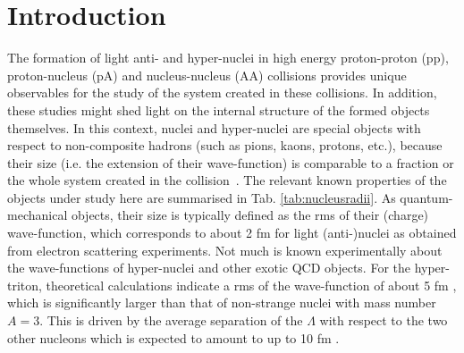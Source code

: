 \section{Introduction} 
The formation of light anti- and hyper-nuclei in high energy proton-proton (pp), proton-nucleus (pA) and nucleus-nucleus (AA) collisions provides unique observables for the study of the system created in these collisions. In addition, these studies might shed light on the internal structure of the formed objects themselves. 
In this context, nuclei and hyper-nuclei are special objects with respect to non-composite hadrons (such as pions, kaons, protons, etc.), because their size (i.e. the extension of their wave-function) is comparable to a fraction or the whole system created in the collision~\cite{Adam:2015vna}.  
The relevant known properties of the objects under study here are summarised in Tab. \ref{tab:nucleusradii}.
As quantum-mechanical objects, their size is typically defined as the rms of their (charge) wave-function, which corresponds to about 2 fm for light (anti-)nuclei as obtained from electron scattering experiments. Not much is known experimentally about the wave-functions of hyper-nuclei and other exotic QCD objects. For the hyper-triton, theoretical calculations indicate a rms of the wave-function of about 5 fm \cite{Nemura:1999qp}, which is significantly larger than that of non-strange nuclei with mass number $A = 3$. This is driven by the average separation of the $\Lambda$ with respect to the two other nucleons which is expected to amount to up to 10 fm \cite{Nemura:1999qp}. 




